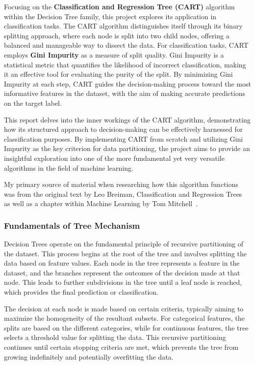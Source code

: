\documentclass[letterpaper,10pt]{article}
\begin{document}
Focusing on the \textbf{Classification and Regression Tree (CART)} algorithm within the Decision Tree family, this project explores its application in classification tasks. The CART algorithm distinguishes itself through its binary splitting approach, where each node is split into two child nodes, offering a balanced and manageable way to dissect the data. For classification tasks, CART employs \textbf{Gini Impurity} as a measure of split quality. Gini Impurity is a statistical metric that quantifies the likelihood of incorrect classification, making it an effective tool for evaluating the purity of the split. By minimizing Gini Impurity at each step, CART guides the decision-making process toward the most informative features in the dataset, with the aim of making accurate predictions on the target label. \par
This report delves into the inner workings of the CART algorithm, demonstrating how its structured approach to decision-making can be effectively harnessed for classification purposes. By implementing CART from scratch and utilizing Gini Impurity as the key criterion for data partitioning, the project aims to provide an insightful exploration into one of the more fundamental yet very versatile algorithms in the field of machine learning. \par

My primary source of material when researching how this algorithm functions was from the original text by Leo Breiman, Classification and Regression Trees~\cite{CARTBreiman} as well as a chapter within Machine Learning by Tom Mitchell~\cite[pp 52-80]{mitchell1997machine}.



\subsubsection{Fundamentals of Tree Mechanism}
Decision Trees operate on the fundamental principle of recursive partitioning of the dataset. This process begins at the root of the tree and involves splitting the data based on feature values. Each node in the tree represents a feature in the dataset, and the branches represent the outcomes of the decision made at that node. This leads to further subdivisions in the tree until a leaf node is reached, which provides the final prediction or classification.\par

The decision at each node is made based on certain criteria, typically aiming to maximize the homogeneity of the resultant subsets. For categorical features, the splits are based on the different categories, while for continuous features, the tree selects a threshold value for splitting the data. This recursive partitioning continues until certain stopping criteria are met, which prevents the tree from growing indefinitely and potentially overfitting the data.\par
\end{document}
